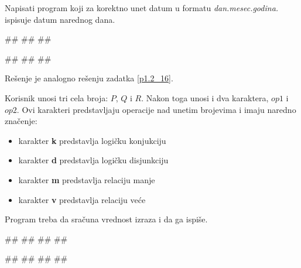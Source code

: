 \begin{Exercise}[label=p1.2_17] 
 Napisati program koji za korektno unet datum u formatu \textit{dan.mesec.godina.} ispisuje datum narednog dana. 
 
\begin{miditest}
\begin{upotreba}{1}
#\naslovInt#
##
##
\end{upotreba}
\end{miditest}
\begin{miditest}
\begin{upotreba}{2}
#\naslovInt#
##
##
\end{upotreba}
\end{miditest}
\end{Exercise}
\begin{Answer}[ref=p1.2_17]
Rešenje je analogno rešenju zadatka \ref{p1.2_16}.
\end{Answer}




\begin{Exercise}[label=p1.9_]
Korisnik unosi tri cela broja: $P$, $Q$ i $R$.
Nakon toga unosi i dva karaktera, $op1$ i $op2$. Ovi karakteri predstavljaju operacije nad unetim brojevima i imaju naredno značenje:
\begin{itemize}
\item karakter \textbf{k} predstavlja  logičku konjukciju
\item karakter \textbf{d} predstavlja  logičku disjunkciju
\item karakter \textbf{m} predstavlja  relaciju manje
\item karakter \textbf{v} predstavlja  relaciju veće
\end{itemize}
Program treba da sračuna vrednost izraza 
 i da ga ispiše.

\begin{miditest}
\begin{upotreba}{1}
#\naslovInt#
##
##
##
\end{upotreba}
\end{miditest}
\begin{miditest}
\begin{upotreba}{2}
#\naslovInt#
##
##
##
\end{upotreba}
\end{miditest}

\end{Exercise}

